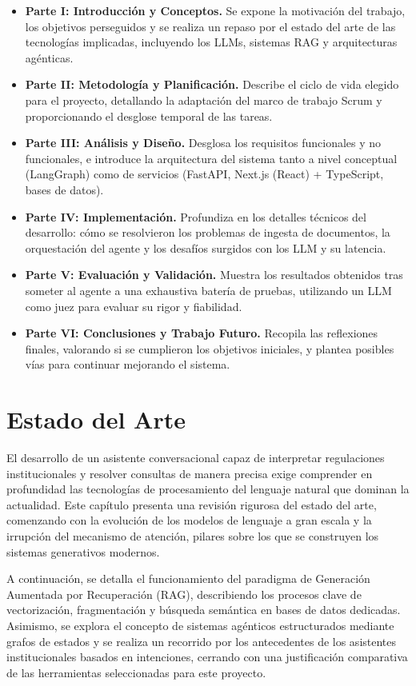 \documentclass[12pt,a4paper,oneside]{report}
\begin{document}
\begin{itemize}
    \item \textbf{Parte I: Introducción y Conceptos.} Se expone la motivación del trabajo, los objetivos perseguidos y se realiza un repaso por el estado del arte de las tecnologías implicadas, incluyendo los LLMs, sistemas RAG y arquitecturas agénticas.
    \item \textbf{Parte II: Metodología y Planificación.} Describe el ciclo de vida elegido para el proyecto, detallando la adaptación del marco de trabajo Scrum y proporcionando el desglose temporal de las tareas.
    \item \textbf{Parte III: Análisis y Diseño.} Desglosa los requisitos funcionales y no funcionales, e introduce la arquitectura del sistema tanto a nivel conceptual (LangGraph) como de servicios (FastAPI, Next.js (React) + TypeScript, bases de datos).
    \item \textbf{Parte IV: Implementación.} Profundiza en los detalles técnicos del desarrollo: cómo se resolvieron los problemas de ingesta de documentos, la orquestación del agente y los desafíos surgidos con los LLM y su latencia.
    \item \textbf{Parte V: Evaluación y Validación.} Muestra los resultados obtenidos tras someter al agente a una exhaustiva batería de pruebas, utilizando un LLM como juez para evaluar su rigor y fiabilidad.
    \item \textbf{Parte VI: Conclusiones y Trabajo Futuro.} Recopila las reflexiones finales, valorando si se cumplieron los objetivos iniciales, y plantea posibles vías para continuar mejorando el sistema.
\end{itemize}

\chapter{Estado del Arte}

El desarrollo de un asistente conversacional capaz de interpretar regulaciones institucionales y resolver consultas de manera precisa exige comprender en profundidad las tecnologías de procesamiento del lenguaje natural que dominan la actualidad. Este capítulo presenta una revisión rigurosa del estado del arte, comenzando con la evolución de los modelos de lenguaje a gran escala y la irrupción del mecanismo de atención, pilares sobre los que se construyen los sistemas generativos modernos.

A continuación, se detalla el funcionamiento del paradigma de Generación Aumentada por Recuperación (RAG), describiendo los procesos clave de vectorización, fragmentación y búsqueda semántica en bases de datos dedicadas. Asimismo, se explora el concepto de sistemas agénticos estructurados mediante grafos de estados y se realiza un recorrido por los antecedentes de los asistentes institucionales basados en intenciones, cerrando con una justificación comparativa de las herramientas seleccionadas para este proyecto.
\end{document}

